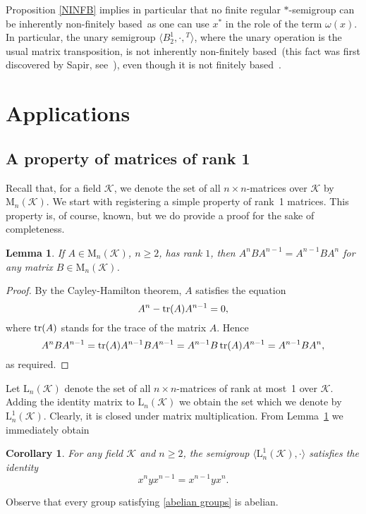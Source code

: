 \documentclass[11pt,reqno]{amsart}
\numberwithin{equation}{section}
\newtheorem{Lemma}[Thm]{Lemma}
\newtheorem{Cor}[Thm]{Corollary}
\theoremstyle{remark}
\def\om{\omega}
\def\fb{finitely based}
\begin{document}
Proposition \ref{NINFB} implies in particular that no finite regular $*$-semigroup can be inherently non-\fb\ as one
can use $x^*$ in the role of the term $\om(x)$. In particular, the unary semigroup $\langle B_2^1,\cdot,{}^T\rangle$,
where the unary operation is the usual matrix transposition, is not inherently non-\fb\ (this fact was first discovered
by Sapir, see~\cite{sapirinverse}), even though it is not finitely based~\cite{kleiman}.

\section{Applications}

\subsection{A property of matrices of rank 1}
Recall that, for a field $\mathcal{K}$, we denote the set of all
$n\times n$-matrices over $\mathcal{K}$ by
$\mathrm{M}_n(\mathcal{K})$. We start with registering a simple
property of rank~1 matrices. This property is, of course, known,
but we do provide a proof for the sake of completeness.
\begin{Lemma}
\label{rank 1} If $A\in\mathrm{M}_n(\mathcal{K})$, $n\ge2$, has
rank $1$, then $A^nBA^{n-1}=A^{n-1}BA^n$ for any matrix
$B\in\mathrm{M}_n(\mathcal{K})$.
\end{Lemma}

\begin{proof}
By the Cayley-Hamilton theorem, $A$ satisfies the equation
$$A^n-\operatorname{tr}(A)A^{n-1}=0,$$
where $\operatorname{tr}(A)$ stands for the trace of the matrix $A$. Hence
$$A^nBA^{n-1}=\operatorname{tr}(A)A^{n-1}BA^{n-1}=A^{n-1}B\operatorname{tr}(A)A^{n-1}=A^{n-1}BA^n,$$
as required.
\end{proof}

Let $\mathrm{L}_n(\mathcal{K})$ denote the set of all $n\times
n$-matrices of rank at most~1 over $\mathcal{K}$. Adding the
identity matrix to $\mathrm{L}_n(\mathcal{K})$ we obtain the set
which we denote by $\mathrm{L}^1_n(\mathcal{K})$. Clearly, it is
closed under matrix multiplication. From Lemma~\ref{rank 1} we
immediately obtain
\begin{Cor}
\label{identity for rank 1} For any field $\mathcal{K}$ and
$n\ge2$, the semigroup
$\langle\mathrm{L}^1_n(\mathcal{K}),\cdot\rangle$ satisfies the
identity
\begin{equation}
\label{abelian groups} x^nyx^{n-1}=x^{n-1}yx^n.
\end{equation}
\end{Cor}
Observe that every group satisfying \eqref{abelian groups} is
abelian.
\end{document}
